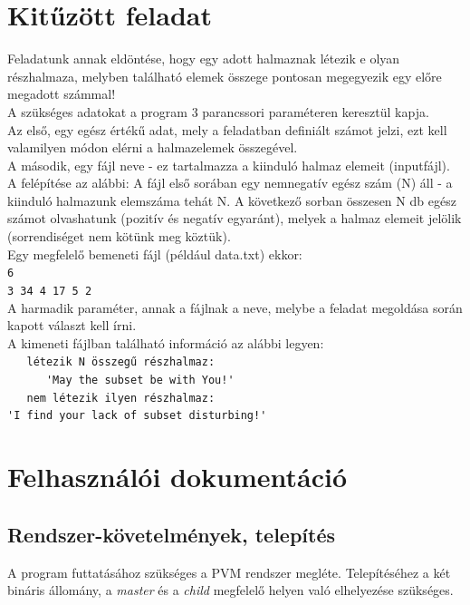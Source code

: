 \documentclass[12pt]{article}
\begin{document}
\section{Kitűzött feladat}

Feladatunk annak eldöntése, hogy egy adott halmaznak létezik e olyan részhalmaza, melyben található elemek összege pontosan megegyezik egy előre megadott számmal!
\\
A szükséges adatokat a program 3 parancssori paraméteren keresztül kapja.
\\
Az első, egy egész értékű adat, mely a feladatban definiált számot jelzi, ezt kell valamilyen módon elérni a halmazelemek összegével.
\\
A második, egy fájl neve - ez tartalmazza a kiinduló halmaz elemeit (inputfájl). A felépítése az alábbi: A fájl első sorában egy nemnegatív egész szám (N) áll - a kiinduló halmazunk elemszáma tehát N. A következő sorban összesen N db egész számot olvashatunk (pozitív és negatív egyaránt), melyek a halmaz elemeit jelölik (sorrendiséget nem kötünk meg köztük).
\\
Egy megfelelő bemeneti fájl (például data.txt) ekkor:
\\
\verb|6| \\
\verb|3 34 4 17 5 2|
\\
A harmadik paraméter, annak a fájlnak a neve, melybe a feladat megoldása során kapott választ kell írni.
\\
A kimeneti fájlban található információ az alábbi legyen:
\\
\verb|   létezik N összegű részhalmaz:| \\
\verb|      'May the subset be with You!'| \\
\verb|   nem létezik ilyen részhalmaz:| \\
\verb|'I find your lack of subset disturbing!'| \\

\section{Felhasználói dokumentáció}

\subsection{Rendszer-követelmények, telepítés}

A program futtatásához szükséges a PVM rendszer megléte. Telepítéséhez a két bináris
állomány, a \textit{master} és a \textit{child} megfelelő helyen való elhelyezése szükséges.
\end{document}

